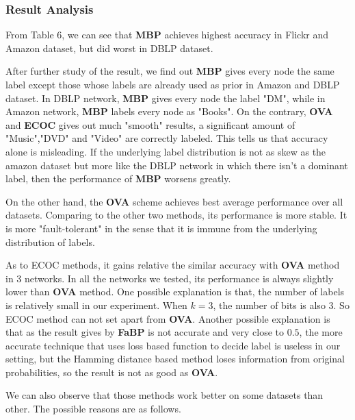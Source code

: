 \subsubsection*{Result Analysis}
From Table 6, we can see that \textbf{MBP} achieves highest accuracy in Flickr and Amazon dataset, but did worst in DBLP dataset. 

After further study of the result, we find out \textbf{MBP} gives every node the same label except those whose labels are already used as prior in Amazon and DBLP dataset. In DBLP network, \textbf{MBP} gives every node the label "DM", while in Amazon network, \textbf{MBP} labels every node as "Books". On the contrary,  \textbf{OVA} and \textbf{ECOC} gives out much "smooth" results, a significant amount of "Music","DVD" and "Video" are correctly labeled. This tells us that accuracy alone is misleading. If the underlying label distribution is not as skew as the amazon dataset but more like the DBLP network in which there isn't a dominant label, then the performance of \textbf{MBP} worsens greatly. 

On the other hand, the \textbf{OVA} scheme achieves best average performance over all datasets. Comparing to the other two methods, its performance is more stable. It is more "fault-tolerant" in the sense that it is immune from the underlying distribution of labels.

As to ECOC methods, it gains relative the similar accuracy with \textbf{OVA} method in 3 networks. In all the networks we tested, its performance is always slightly lower than \textbf{OVA} method. One possible explanation is that, the number of labels is relatively small in our experiment. When $k=3$, the number of bits is also 3. So ECOC method can not set apart from \textbf{OVA}. Another possible explanation is that as the result gives by \textbf{FaBP} is not accurate and very close to $0.5$, the more accurate technique that uses loss based function to decide label is useless in our setting, but the Hamming distance based method loses information from original probabilities, so the result is not as good as \textbf{OVA}.

We can also observe that those methods work better on some datasets than other. The possible reasons are as follows.

